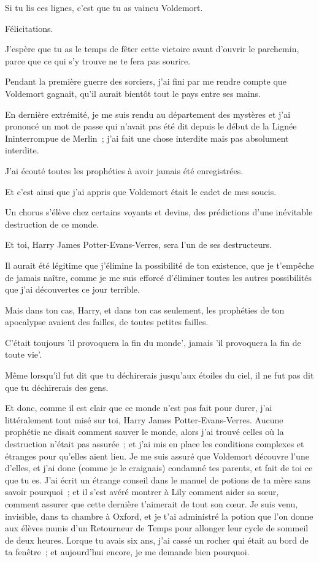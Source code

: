 \later
\begin{writtenNote}

Si tu lis ces lignes, c'est que tu as vaincu Voldemort.

Félicitations.

J'espère que tu as le temps de fêter cette victoire avant d'ouvrir le parchemin, parce que ce qui s'y trouve ne te fera pas sourire.

Pendant la première guerre des sorciers, j'ai fini par me rendre compte que Voldemort gagnait, qu'il aurait bientôt tout le pays entre ses mains.

En dernière extrémité, je me suis rendu au département des mystères et j'ai prononcé un mot de passe qui n'avait pas été dit depuis le début de la Lignée Ininterrompue de Merlin~; j'ai fait une chose interdite mais pas absolument interdite.

J'ai écouté toutes les prophéties à avoir jamais été enregistrées.

Et c'est ainsi que j'ai appris que Voldemort était le cadet de mes soucis.

Un chorus s'élève chez certains voyants et devins, des prédictions d'une inévitable destruction de ce monde.

Et toi, Harry James Potter-Evans-Verres, sera l'un de ses destructeurs.

Il aurait été légitime que j'élimine la possibilité de ton existence, que je t'empêche de jamais naître, comme je me suis efforcé d'éliminer toutes les autres possibilités que j'ai découvertes ce jour terrible.

Mais dans ton cas, Harry, et dans ton cas seulement, les prophéties de ton apocalypse avaient des failles, de toutes petites failles.

C'était toujours 'il provoquera la fin du monde', jamais 'il provoquera la fin de toute vie'.

Même lorsqu'il fut dit que tu déchirerais jusqu'aux étoiles du ciel, il ne fut pas dit que tu déchirerais des gens.

Et donc, comme il est clair que ce monde n'est pas fait pour durer, j'ai littéralement tout misé sur toi, Harry James Potter-Evans-Verres. Aucune prophétie ne disait comment sauver le monde, alors j'ai trouvé celles où la destruction n'était pas assurée~; et j'ai mis en place les conditions complexes et étranges pour qu'elles aient lieu. Je me suis assuré que Voldemort découvre l'une d'elles, et j'ai donc (comme je le craignais) condamné tes parents, et fait de toi ce que tu es. J'ai écrit un étrange conseil dans le manuel de potions de ta mère sans savoir pourquoi~; et il s'est avéré montrer à Lily comment aider sa sœur, comment assurer que cette dernière t'aimerait de tout son cœur. Je suis venu, invisible, dans ta chambre à Oxford, et je t'ai administré la potion que l'on donne aux élèves munis d'un Retourneur de Temps pour allonger leur cycle de sommeil de deux heures. Lorque tu avais six ans, j'ai cassé un rocher qui était au bord de ta fenêtre~; et aujourd'hui encore, je me demande bien pourquoi.


\end{writtenNote}
